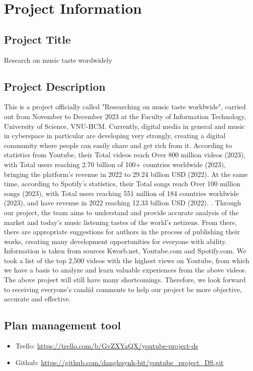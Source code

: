 \documentclass[13pt]{article}
\begin{document}
\section{Project Information}

\subsection{Project Title}
Research on music taste wordwidely
\subsection{Project Description}
This is a project officially called "Researching on music taste worldwide", carried out from November to December 2023 at the Faculty of Information Technology, University of Science, VNU-HCM.
Currently, digital media in general and music in cyberspace in particular are developing very strongly, creating a digital community where people can easily share and get rich from it. According to statistics from Youtube, their Total videos reach Over 800 million videos (2023), with Total users reaching 2.70 billion of 100+ countries worldwide (2023), bringing the platform's revenue in 2022 to 29.24 billion USD (2022). 
At the same time, according to Spotify's statistics, their Total songs reach Over 100 million songs (2023), with Total users reaching 551 million of 184 countries worldwide (2023), and have revenue in 2022 reaching 12.33 billion USD (2022). .
Through our project, the team aims to understand and provide accurate analysis of the market and today's music listening tastes of the world's netizens. From there, there are appropriate suggestions for authors in the process of publishing their works, creating many development opportunities for everyone with ability.
Information is taken from sources Kworb.net, Youtube.com and Spotify.com. We took a list of the top 2,500 videos with the highest views on Youtube, from which we have a basis to analyze and learn valuable experiences from the above videos.
The above project will still have many shortcomings. Therefore, we look forward to receiving everyone's candid comments to help our project be more objective, accurate and effective.

\subsection{Plan management tool}
\begin{itemize}
    \item Trello: \url{https://trello.com/b/GvZXYaQX/youtube-project-ds}
    \item Github: \url{https://github.com/danghuynh-bit/youtube_project_DS.git}
\end{itemize}
\newpage
\end{document}
